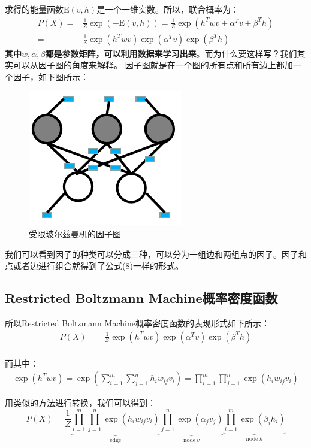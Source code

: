 \documentclass[a4paper]{article}
\begin{document}
求得的能量函数$\mathrm{E}(v,h)$是一个一维实数。所以，联合概率为：
\begin{equation}
\begin{split}
    P(X) = & \frac{1}{Z} \exp (-\mathrm{E}(v,h)) =  \frac{1}{Z} \exp (h^T w v + \alpha^T v + \beta^T h) \\
    = & \frac{1}{Z} \exp(h^T w v)\exp(\alpha^T v)\exp(\beta^T h) 
\end{split}
\end{equation}
\textbf{其中$ w,\alpha,\beta$都是参数矩阵，可以利用数据来学习出来}。而为什么要这样写？我们其实可以从因子图的角度来解释。
因子图就是在一个图的所有点和所有边上都加一个因子，如下图所示：
\begin{figure}[H]
    \centering
    \includegraphics[width=.3\textwidth]{微信图片_20200229004607.png}
    \caption{受限玻尔兹曼机的因子图}
    \label{fig:my_label_1}
\end{figure}

我们可以看到因子的种类可以分成三种，可以分为一组边和两组点的因子。因子和点或者边进行组合就得到了公式(8)一样的形式。

\subsection{Restricted Boltzmann Machine概率密度函数}
所以Restricted Boltzmann Machine概率密度函数的表现形式如下所示：
\begin{equation}
    \begin{split}
    P(X) 
    = & \frac{1}{Z} \exp(h^T w v)\exp(\alpha^T v)\exp(\beta^T h) \\
    \end{split}
\end{equation}

而其中：
\begin{equation}
    \begin{split}
        \exp(h^T w v) =  \exp(\sum_{i=1}^m \sum_{j=1}^n h_iw_{ij}v_i) = \prod_{i=1}^m \prod_{j=1}^n \exp( h_iw_{ij}v_i) 
    \end{split}
\end{equation}

用类似的方法进行转换，我们可以得到：
\begin{equation}
    P(X) 
    = \frac{1}{Z} \underbrace{\prod_{i=1}^m \prod_{j=1}^n \exp( h_iw_{ij}v_i)}_{\mathrm{edge}} \underbrace{\prod_{j=1}^n \exp( \alpha_jv_j)}_{\mathrm{node}\ v} \underbrace{\prod_{i=1}^m \exp( \beta_ih_i)}_{\mathrm{node}\ h} 
\end{equation}
\end{document}
